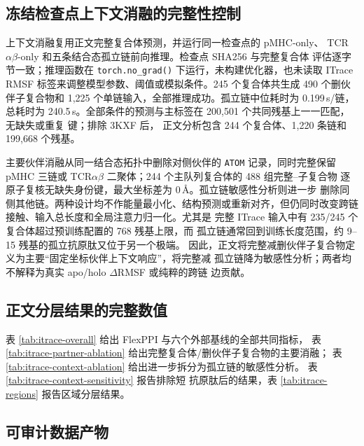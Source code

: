 \subsection{冻结检查点上下文消融的完整性控制}

上下文消融复用正文完整复合体预测，并运行同一检查点的 pMHC-only、
TCR$\alpha\beta$-only 和五条结合态孤立链前向推理。检查点 SHA256 与完整复合体
评估逐字节一致；推理函数在
\texttt{torch.no\_grad()} 下运行，未构建优化器，也未读取 ITrace RMSF
标签来调整模型参数、阈值或模拟条件。245 个复合体共生成 490 个删伙伴子复合物和
1,225 个单链输入，全部推理成功。孤立链中位耗时为 0.199\,s/链，总耗时为
240.5\,s。全部条件的预测与主标签在 200,501 个共同残基上一一匹配，无缺失或重复
键；排除 3KXF 后，
正文分析包含 244 个复合体、1,220 条链和 199,668 个残基。

主要伙伴消融从同一结合态拓扑中删除对侧伙伴的 \texttt{ATOM} 记录，同时完整保留
pMHC 三链或 TCR$\alpha\beta$ 二聚体；244 个主队列复合体的 488 组完整--子复合物
逐原子复核无缺失身份键，最大坐标差为 $0\,\text{\AA}$。孤立链敏感性分析则进一步
删除同侧其他链。两种设计均不作能量最小化、结构预测或重新对齐，但仍同时改变跨链
接触、输入总长度和全局注意力归一化。尤其是
完整 ITrace 输入中有 235/245 个复合体超过预训练配置的 768 残基上限，而
孤立链通常回到训练长度范围，约 9--15 残基的孤立抗原肽又位于另一个极端。
因此，正文将完整减删伙伴子复合物定义为主要“固定坐标伙伴上下文响应”，将完整减
孤立链降为敏感性分析；两者均不解释为真实 apo/holo $\Delta$RMSF 或纯粹的跨链
边贡献。

\subsection{正文分层结果的完整数值}

表 \ref{tab:itrace-overall} 给出 FlexPPI 与六个外部基线的全部共同指标，
表 \ref{tab:itrace-partner-ablation} 给出完整复合体/删伙伴子复合物的主要消融；
表 \ref{tab:itrace-context-ablation} 给出进一步拆分为孤立链的敏感性分析。
表 \ref{tab:itrace-context-sensitivity} 报告排除短
抗原肽后的结果，表 \ref{tab:itrace-regions} 报告区域分层结果。











\subsection{可审计数据产物}

